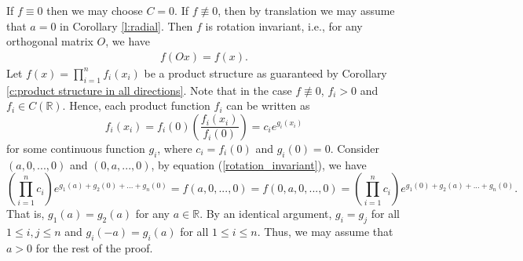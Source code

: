 \documentclass[12pt]{amsart}
\numberwithin{equation}{section}
\theoremstyle{plain}
\theoremstyle{definition}
\begin{document}
If $f \equiv 0$ then we may choose $C = 0$.  If $f \not \equiv 0$, then by translation we may assume that $a=0$ in Corollary \ref{l:radial}. Then $f$ is rotation invariant, i.e., for any orthogonal matrix $O$, we have
\begin{align}\label{rotation_invariant}
f(Ox)=f(x).
\end{align}
Let $f(x) = \prod_{i=1}^nf_i(x_i)$ be a product structure as guaranteed by Corollary \ref{c:product structure in all directions}.  Note that in the case $f\not \equiv 0$, $f_i>0$ and $f_i \in C(\mathbb{R})$. Hence, each product function $f_i$ can be written as 
$$f_i(x_i)=f_i(0)\left(\frac{f_i(x_i)}{f_i(0)}\right)=c_ie^{g_i(x_i)}$$
for some continuous function $g_i$, where $c_i=f_i(0)$ and $g_i(0)=0$. Consider $(a,0,...,0)$ and $(0,a,...,0)$, by equation (\ref{rotation_invariant}), we have
$$\left(\prod_{i=1}^nc_i\right)e^{g_1(a)+g_2(0)+...+g_n(0)}=f(a,0,...,0)=f(0,a,0,...,0)=\left(\prod_{i=1}^nc_i\right)e^{g_1(0)+g_2(a)+...+g_n(0)}.$$
That is, $g_1(a)=g_2(a)$ for any $a\in \mathbb{R}$. By an identical argument, $g_i = g_j$ for all $1\le i, j \le n$ and $g_i(-a)= g_i(a)$ for all $1\leq i\leq n$. Thus, we may assume that $a> 0$ for the rest of the proof.

\end{document}
